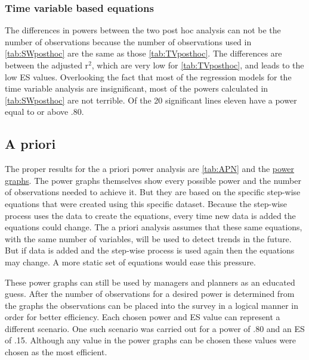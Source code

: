 \subsubsection{Time variable based equations}
The differences in powers between the two post hoc analysis can not be the number of observations because the number of observations used in \autoref{tab:SWposthoc} are the same as those \autoref{tab:TVposthoc}.
The differences are between the adjusted r$^2$, which are very low for \autoref{tab:TVposthoc}, and leads to the low ES values.
Overlooking the fact that most of the regression models for the time variable analysis are insignificant, most of the powers calculated in \autoref{tab:SWposthoc} are not terrible.
Of the 20 significant lines eleven have a power equal to or above .80.

\subsection{A priori}%
The proper results for the a priori power analysis are \autoref{tab:APN} and the \hyperref[ch:APA]{power graphs}.
The power graphs themselves show every possible power and the number of observations needed to achieve it.
But they are based on the specific step-wise equations that were created using this specific dataset.
Because the step-wise process uses the data to create the equations, every time new data is added the equations could change.
The a priori analysis assumes that these same equations, with the same number of variables, will be used to detect trends in the future.
But if data is added and the step-wise process is used again then the equations may change.
A more static set of equations would ease this pressure.

These power graphs can still be used by managers and planners as an educated guess.
After the number of observations for a desired power is determined from the graphs the observations can be placed into the survey in a logical manner in order for better efficiency.
Each chosen power and ES value can represent a different scenario.
One such scenario was carried out for a power of .80 and an ES of .15.
Although any value in the power graphs can be chosen these values were chosen as the most efficient. 

